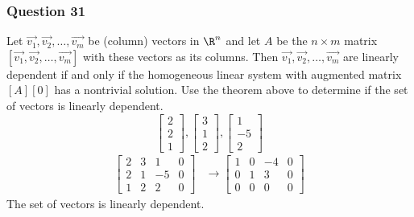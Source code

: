 \documentclass{math}
\begin{document}
\subsubsection*{Question 31}
Let \( \vec{v_1},\vec{v_2},\dots,\vec{v_m} \) be (column) vectors in \( \R^n \)
and let \( A \) be the \( n\times m \) matrix
\( [\vec{v_1},\vec{v_2},\dots,\vec{v_m}] \) with these vectors as its columns.
Then \( \vec{v_1},\vec{v_2},\dots,\vec{v_m} \) are linearly dependent if and
only if the homogeneous linear system with augmented matrix \( [A][0] \) has a
nontrivial solution. Use the theorem above to determine if the set of vectors is
linearly dependent.
\[ \begin{bmatrix}2 \\ 2 \\ 1\end{bmatrix},
  \begin{bmatrix}3 \\ 1 \\ 2\end{bmatrix},
  \begin{bmatrix}1 \\ -5 \\ 2\end{bmatrix} \]
\begin{align*}
  \begin{bmatrix}
    2 & 3 & 1 & 0 \\
    2 & 1 & -5 & 0 \\
    1 & 2 & 2 & 0
  \end{bmatrix} &\to \begin{bmatrix}
    1 & 0 & -4 & 0 \\
    0 & 1 & 3 & 0 \\
    0 & 0 & 0 & 0
  \end{bmatrix}
\end{align*}
The set of vectors is linearly dependent.
\end{document}
